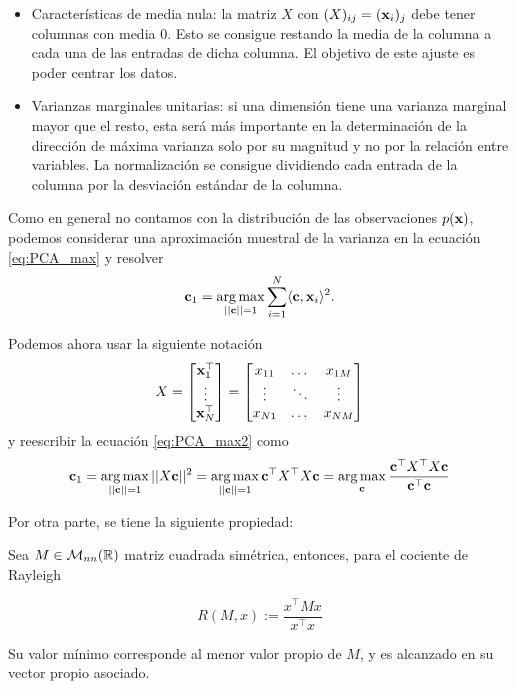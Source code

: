\begin{itemize}
	\item Características de media nula: la matriz $X$ con $(X)_{ij} = (\mathbf{x}_i)_j$ debe tener columnas con media $0$. Esto se consigue restando la media de la columna a cada una de las entradas de dicha columna. El objetivo de este ajuste es poder centrar los datos.
	\item Varianzas marginales unitarias: si una dimensión tiene una varianza marginal mayor que el resto, esta será más importante en la determinación de la dirección de máxima varianza solo por su magnitud y no por la relación entre variables. La normalización se consigue dividiendo cada entrada de la columna por la desviación estándar de la columna.
\end{itemize}

Como en general no contamos con la distribución de las observaciones $p(\mathbf{x})$, podemos considerar una aproximación muestral de la varianza en la ecuación \eqref{eq:PCA_max} y resolver 
\begin{align}
	\mathbf{c}_1 = \operatorname*{arg\,max}_{||\mathbf{c}||=1} \sum_{i=1}^N \langle\mathbf{c},\mathbf{x}_i\rangle^2.\label{eq:PCA_max2}
\end{align}

Podemos ahora usar la siguiente notación
$$
X=\begin{bmatrix}
        \mathbf{x}_1^\top\\
        \vdots\\
        \mathbf{x}_N^\top\\
        \end{bmatrix}=
        \begin{bmatrix}
        {x}_{11}    & \dots & {x}_{1M}  \\
        \vdots          & \ddots& \vdots        \\
        {x}_{N1}    & \dots & {x}_{NM}
        \end{bmatrix}
$$
y reescribir la ecuación \eqref{eq:PCA_max2} como 
\begin{equation}
	\mathbf{c}_1 = \operatorname*{arg\,max}_{||\mathbf{c}||=1} ||X\mathbf{c}||^2 
			= \operatorname*{arg\,max}_{||\mathbf{c}||=1} \mathbf{c}^\top X^\top X \mathbf{c}
			= \operatorname*{arg\,max}_{\mathbf{c}} \frac{\mathbf{c}^\top X^\top X \mathbf{c}}{\mathbf{c}^\top \mathbf{c}}
			\label{eq:PCA_max3}
\end{equation}

Por otra parte, se tiene la siguiente propiedad:

\begin{lemma}

Sea $M\in\mathcal{M}_{nn}(\mathbb{R})$ matriz cuadrada simétrica, entonces, para el cociente de Rayleigh

\begin{equation}
	R(M,x):=\frac{x^\top Mx}{x^\top x}
\end{equation}

Su valor mínimo corresponde al menor valor propio de $M$, y es alcanzado en su vector propio asociado.

\end{lemma}


